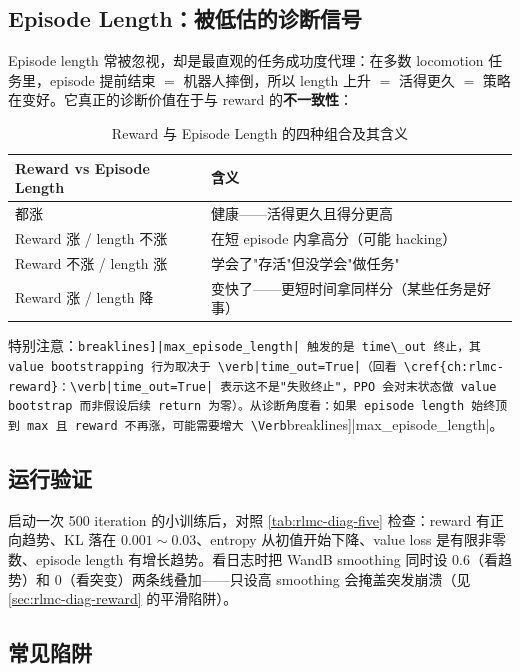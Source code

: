 \subsection{Episode Length：被低估的诊断信号}

Episode length 常被忽视，却是最直观的任务成功度代理：在多数 locomotion 任务里，episode 提前结束 $=$ 机器人摔倒，所以 length 上升 $=$ 活得更久 $=$ 策略在变好。它真正的诊断价值在于与 reward 的\textbf{不一致性}：

\begin{table}[H]
\centering
\caption{Reward 与 Episode Length 的四种组合及其含义}
\label{tab:rlmc-diag-rewlen}
\begin{tabular}{p{4.2cm}p{8.0cm}}
\hline
Reward vs Episode Length & 含义 \\
\hline
都涨 & 健康——活得更久且得分更高 \\
Reward 涨 / length 不涨 & 在短 episode 内拿高分（可能 hacking） \\
Reward 不涨 / length 涨 & 学会了"存活"但没学会"做任务" \\
Reward 涨 / length 降 & 变快了——更短时间拿同样分（某些任务是好事） \\
\hline
\end{tabular}
\end{table}

特别注意：\Verb[breaklines]|max_episode_length| 触发的是 time\_out 终止，其 value bootstrapping 行为取决于 \verb|time_out=True|（回看 \cref{ch:rlmc-reward}：\verb|time_out=True| 表示这不是"失败终止"，PPO 会对末状态做 value bootstrap 而非假设后续 return 为零）。从诊断角度看：如果 episode length 始终顶到 max 且 reward 不再涨，可能需要增大 \Verb[breaklines]|max_episode_length|。

\subsection{运行验证}

启动一次 500 iteration 的小训练后，对照 \cref{tab:rlmc-diag-five} 检查：reward 有正向趋势、KL 落在 $0.001\sim0.03$、entropy 从初值开始下降、value loss 是有限非零数、episode length 有增长趋势。看日志时把 WandB smoothing 同时设 0.6（看趋势）和 0（看突变）两条线叠加——只设高 smoothing 会掩盖突发崩溃（见 \cref{sec:rlmc-diag-reward} 的平滑陷阱）。

\subsection{常见陷阱}

